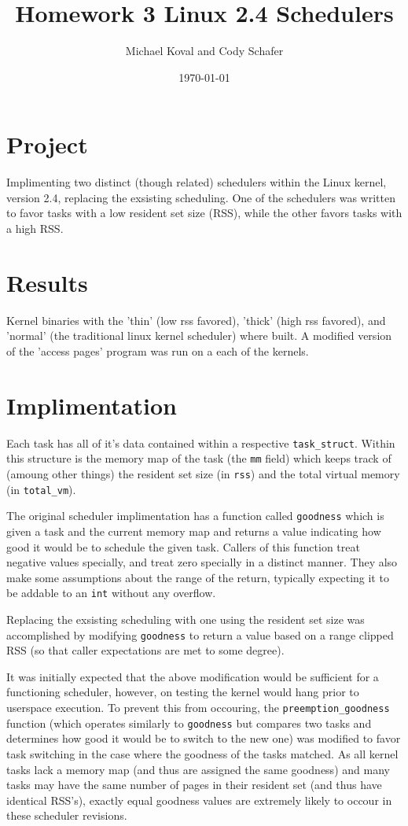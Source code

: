 \documentclass[10pt]{article}
\title{\textbf{Homework 3}
Linux 2.4 Schedulers}
\author{Michael Koval and Cody Schafer}
\date{\today}
\begin{document}
\maketitle

\section{Project}

Implimenting two distinct (though related) schedulers within the Linux
kernel, version 2.4, replacing the exsisting scheduling. One of the
schedulers was written to favor tasks with a low resident set size (RSS),
while the other favors tasks with a high RSS.

\section{Results}

Kernel binaries with the 'thin' (low rss favored), 'thick'  (high rss
favored), and 'normal' (the traditional linux kernel scheduler) where
built. A modified version of the 'access pages' program was run on a
each of the kernels. 

\section{Implimentation}

Each task has all of it's data contained within a respective
\texttt{task\_struct}. Within this structure is the memory map of the task
(the \texttt{mm} field) which keeps track of (amoung other things) the
resident set size (in \texttt{rss}) and the total virtual memory (in
\texttt{total\_vm}).

The original scheduler implimentation has a function called
\texttt{goodness} which is given a task and the current memory map and
returns a value indicating how good it would be to schedule the given
task. Callers of this function treat negative values specially, and treat
zero specially in a distinct manner. They also make some assumptions about
the range of the return, typically expecting it to be addable to an
\texttt{int} without any overflow.

Replacing the exsisting scheduling with one using the resident set size
was accomplished by modifying \texttt{goodness} to return a value based on
a range clipped RSS (so that caller expectations are met to some degree).

It was initially expected that the above modification would be sufficient
for a functioning scheduler, however, on testing the kernel would hang
prior to userspace execution. To prevent this from occouring, the
\texttt{preemption\_goodness} function (which operates similarly to
\texttt{goodness} but compares two tasks and determines how good it would
be to switch to the new one) was modified to favor task switching in the
case where the goodness of the tasks matched. As all kernel tasks lack a
memory map (and thus are assigned the same goodness) and many tasks may
have the same number of pages in their resident set (and thus have
identical RSS's), exactly equal goodness values are extremely likely to
occour in these scheduler revisions.
\end{document}
